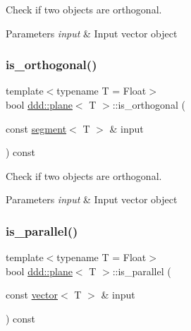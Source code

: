 Check if two objects are orthogonal. 


\begin{DoxyParams}{Parameters}
{\em input} & Input vector object \\
\hline
\end{DoxyParams}
\mbox{\label{classddd_1_1plane_a110e20cb229dd24588557dcc96b2d099}} 
\subsubsection{\texorpdfstring{is\+\_\+orthogonal()}{is\_orthogonal()}\hspace{0.1cm}{\footnotesize\ttfamily [5/5]}}
{\footnotesize\ttfamily template$<$typename T = Float$>$ \\
bool \hyperlink{classddd_1_1plane}{ddd\+::plane}$<$ T $>$\+::is\+\_\+orthogonal (\begin{DoxyParamCaption}\item[{const \hyperlink{classddd_1_1segment}{segment}$<$ T $>$ \&}]{input }\end{DoxyParamCaption}) const\hspace{0.3cm}{\ttfamily [inline]}}



Check if two objects are orthogonal. 


\begin{DoxyParams}{Parameters}
{\em input} & Input vector object \\
\hline
\end{DoxyParams}
\mbox{\label{classddd_1_1plane_af5aca29c531998c539cd8df3236e81d7}} 
\subsubsection{\texorpdfstring{is\+\_\+parallel()}{is\_parallel()}\hspace{0.1cm}{\footnotesize\ttfamily [1/5]}}
{\footnotesize\ttfamily template$<$typename T = Float$>$ \\
bool \hyperlink{classddd_1_1plane}{ddd\+::plane}$<$ T $>$\+::is\+\_\+parallel (\begin{DoxyParamCaption}\item[{const \hyperlink{classddd_1_1vector}{vector}$<$ T $>$ \&}]{input }\end{DoxyParamCaption}) const\hspace{0.3cm}{\ttfamily [inline]}}



